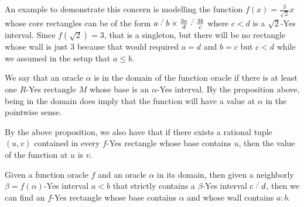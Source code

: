 \documentclass[12pt]{article}
\begin{document}
An example to demonstrate this concern is modelling the function $f(x) = \frac{3}{\sqrt{2}}x$ whose core rectangles can be of the form $a\lte b \times \frac{3a}{d} \lte \frac{3b}{c}$ where $c\lt d$ is a $\sqrt{2}$-Yes interval.  Since $f(\sqrt{2}) = 3$, that is a singleton, but there will be no rectangle whose wall is just $3$ because that would required $a=d$ and $b=c$ but $c < d$ while we assumed in the setup that $a \leq b$. 

We say that an oracle $\alpha$ is in the domain of the function oracle if there is at least one $R$-Yes rectangle $M$ whose base is an $\alpha$-Yes interval. By the proposition above, being in the domain does imply that the function will have a value at $\alpha$ in the pointwise sense. 

By the above proposition, we also have that if there exists a rational tuple $(u,v)$ contained in every $f$-Yes rectangle whose base contains $u$, then the value of the function at $u$ is $v$.


\begin{corollary}\label{cor:wallorac}
    Given a function oracle $f$ and an oracle $\alpha$ in its domain, then given a neighborly $\beta=f(\alpha)$-Yes interval $a\lt b$ that strictly contains a $\beta$-Yes interval $c \lte d$, then we can find an $f$-Yes rectangle whose base contains $\alpha$ and whose wall contains $a:b$.
\end{corollary}
\end{document}
